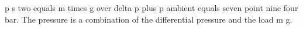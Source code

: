 p s two equals m times g over delta p plus p ambient equals seven point nine four bar. The pressure is a combination of the differential pressure and the load m g.